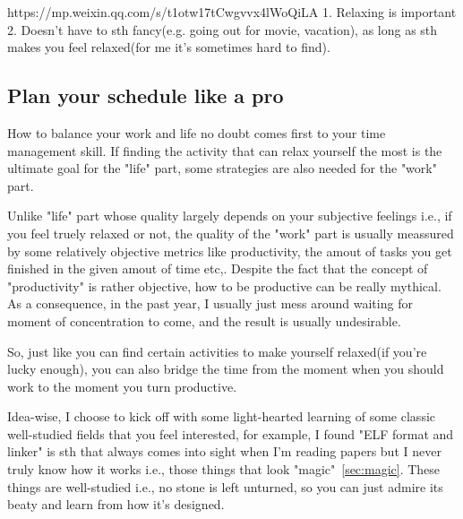 https://mp.weixin.qq.com/s/t1otw17tCwgvvx4lWoQiLA
1. Relaxing is important
2. Doesn't have to sth fancy(e.g. going out for movie, vacation), as long as sth makes you feel relaxed(for me it's sometimes hard to find).
\subsection{Plan your schedule like a pro}
How to balance your work and life no doubt comes first to your time management skill. 
If finding the activity that can relax yourself the most is the ultimate goal for the "life" part, 
some strategies are also needed for the "work" part.

Unlike "life" part whose quality largely depends on your subjective feelings i.e., if you feel truely relaxed or not, the quality of the "work" part is usually
meassured by some relatively objective metrics like productivity, the amout of tasks you get finished in the given amout of time etc,.
Despite the fact that the concept of "productivity" is rather objective, how to be productive can be really mythical. 
As a consequence, in the past year, I usually just mess around waiting for moment of concentration to come, and the result is usually undesirable.

So, just like you can find certain activities to make yourself relaxed(if you're lucky enough), you can also bridge the time from the moment when you should work
to the moment you turn productive. 

Idea-wise, I choose to kick off with some light-hearted learning of some classic well-studied fields that you feel interested, 
for example, I found "ELF format and linker" is sth that always comes into sight when I'm reading papers but I never truly know how it works
i.e., those things that look "magic"~\ref{sec:magic}. These things are well-studied i.e., no stone is left unturned, 
so you can just admire its beaty and learn from how it's designed.
